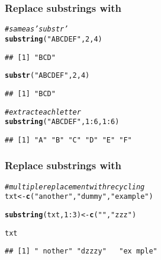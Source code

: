 \documentclass[12pt]{beamer}\usepackage[]{graphicx}\usepackage[]{color}
\makeatletter
\newcommand{\hlnum}[1]{\textcolor[rgb]{0.686,0.059,0.569}{#1}}%
\newcommand{\hlstr}[1]{\textcolor[rgb]{0.192,0.494,0.8}{#1}}%
\newcommand{\hlcom}[1]{\textcolor[rgb]{0.678,0.584,0.686}{\textit{#1}}}%
\newcommand{\hlopt}[1]{\textcolor[rgb]{0,0,0}{#1}}%
\newcommand{\hlstd}[1]{\textcolor[rgb]{0.345,0.345,0.345}{#1}}%
\newcommand{\hlkwb}[1]{\textcolor[rgb]{0.69,0.353,0.396}{#1}}%
\newcommand{\hlkwd}[1]{\textcolor[rgb]{0.737,0.353,0.396}{\textbf{#1}}}%
\newenvironment{kframe}{%
 \def\at@end@of@kframe{}%
 \ifinner\ifhmode%
  \def\at@end@of@kframe{\end{minipage}}%
  \begin{minipage}{\columnwidth}%
 \fi\fi%
 \def\FrameCommand##1{\hskip\@totalleftmargin \hskip-\fboxsep
 \colorbox{shadecolor}{##1}\hskip-\fboxsep
     \hskip-\linewidth \hskip-\@totalleftmargin \hskip\columnwidth}%
 \MakeFramed {\advance\hsize-\width
   \@totalleftmargin\z@ \linewidth\hsize
   \@setminipage}}%
 {\par\unskip\endMakeFramed%
 \at@end@of@kframe}
\newenvironment{knitrout}{}{} %
\makeatother
\begin{document}

\begin{frame}[fragile]
\frametitle{Replace substrings with }

\begin{knitrout}\footnotesize
{}\color{fgcolor}\begin{kframe}
\begin{alltt}
\hlcom{# same as 'substr'}
\hlkwd{substring}\hlstd{(}\hlstr{"ABCDEF"}\hlstd{,} \hlnum{2}\hlstd{,} \hlnum{4}\hlstd{)}
\end{alltt}
\begin{verbatim}
## [1] "BCD"
\end{verbatim}
\begin{alltt}
\hlkwd{substr}\hlstd{(}\hlstr{"ABCDEF"}\hlstd{,} \hlnum{2}\hlstd{,} \hlnum{4}\hlstd{)}
\end{alltt}
\begin{verbatim}
## [1] "BCD"
\end{verbatim}
\begin{alltt}
\hlcom{# extract each letter}
\hlkwd{substring}\hlstd{(}\hlstr{"ABCDEF"}\hlstd{,} \hlnum{1}\hlopt{:}\hlnum{6}\hlstd{,} \hlnum{1}\hlopt{:}\hlnum{6}\hlstd{)}
\end{alltt}
\begin{verbatim}
## [1] "A" "B" "C" "D" "E" "F"
\end{verbatim}
\end{kframe}
\end{knitrout}

\end{frame}


\begin{frame}[fragile]
\frametitle{Replace substrings with }

\begin{knitrout}\footnotesize
{}\color{fgcolor}\begin{kframe}
\begin{alltt}
\hlcom{# multiple replacement with recycling}
\hlstd{txt} \hlkwb{<-} \hlkwd{c}\hlstd{(}\hlstr{"another"}\hlstd{,} \hlstr{"dummy"}\hlstd{,} \hlstr{"example"}\hlstd{)}

\hlkwd{substring}\hlstd{(txt,} \hlnum{1}\hlopt{:}\hlnum{3}\hlstd{)} \hlkwb{<-} \hlkwd{c}\hlstd{(}\hlstr{" "}\hlstd{,} \hlstr{"zzz"}\hlstd{)}

\hlstd{txt}
\end{alltt}
\begin{verbatim}
## [1] " nother" "dzzzy"   "ex mple"
\end{verbatim}
\end{kframe}
\end{knitrout}

\end{frame}
\end{document}
